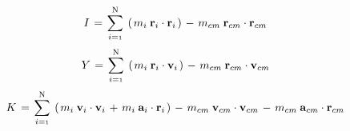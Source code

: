\documentclass[10pt,fleqn]{article}
\newcommand{\mM}{m}
\newcommand{\mI}{I}
\newcommand{\mY}{Y}
\newcommand{\mK}{K}
\newcommand{\ri}{_i}
\newcommand{\rcm}{_{cm}}
\newcommand{\vR}{\mathbf{r}}
\newcommand{\vV}{\mathbf{v}}
\newcommand{\vA}{\mathbf{a}}
\begin{document}
\medskip
\begin{eqnarray*}
\hspace{+1.50em} \mI \hspace{+0.12em} = \hspace{+0.12em} \sum_{i={\scriptscriptstyle 1}}^{\mathrm N} \hspace{+0.24em} \left( \hspace{+0.12em} \mM\ri \hspace{+0.24em} \vR\ri \cdot \vR\ri \hspace{+0.12em} \right) \hspace{+0.12em} - \hspace{+0.12em} \mM\rcm \hspace{+0.24em} \vR\rcm \cdot \vR\rcm
\end{eqnarray*}
\begin{eqnarray*}
\hspace{+1.50em} \mY \hspace{+0.12em} = \hspace{+0.12em} \sum_{i={\scriptscriptstyle 1}}^{\mathrm N} \hspace{+0.24em} \left( \hspace{+0.12em} \mM\ri \hspace{+0.24em} \vR\ri \cdot \vV\ri \hspace{+0.12em} \right) \hspace{+0.12em} - \hspace{+0.12em} \mM\rcm \hspace{+0.24em} \vR\rcm \cdot \vV\rcm
\end{eqnarray*}
\begin{eqnarray*}
\hspace{+1.50em} \mK \hspace{+0.12em} = \hspace{+0.12em} \sum_{i={\scriptscriptstyle 1}}^{\mathrm N} \hspace{+0.24em} \left( \hspace{+0.12em} \mM\ri \hspace{+0.24em} \vV\ri \cdot \vV\ri \hspace{+0.12em} + \hspace{+0.12em} \mM\ri \hspace{+0.24em} \vA\ri \cdot \vR\ri \hspace{+0.12em} \right) \hspace{+0.12em} - \hspace{+0.12em} \mM\rcm \hspace{+0.24em} \vV\rcm \cdot \vV\rcm \hspace{+0.12em} - \hspace{+0.12em} \mM\rcm \hspace{+0.24em} \vA\rcm \cdot \vR\rcm
\end{eqnarray*}
\end{document}
